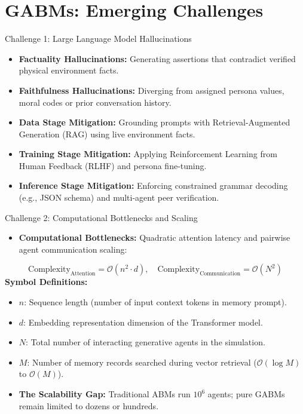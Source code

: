 \documentclass{beamer}
\begin{document}
\section{GABMs: Emerging Challenges}

\begin{frame}{Challenge 1: Large Language Model Hallucinations}
\begin{itemize}
    \item \textbf{Factuality Hallucinations:} Generating assertions that contradict verified physical environment facts.
    \medskip
    \item \textbf{Faithfulness Hallucinations:} Diverging from assigned persona values, moral codes or prior conversation history.
    \medskip
    \item \textbf{Data Stage Mitigation:} Grounding prompts with Retrieval-Augmented Generation (RAG) using live environment facts.
    \medskip
    \item \textbf{Training Stage Mitigation:} Applying Reinforcement Learning from Human Feedback (RLHF) and persona fine-tuning.
    \medskip
    \item \textbf{Inference Stage Mitigation:} Enforcing constrained grammar decoding (e.g., JSON schema) and multi-agent peer verification.
\end{itemize}
\end{frame}

\begin{frame}{Challenge 2: Computational Bottlenecks and Scaling}
\begin{itemize}
    \item \textbf{Computational Bottlenecks:} Quadratic attention latency and pairwise agent communication scaling:
\end{itemize}
\vspace{-0.15cm}
\begin{equation*}
\text{Complexity}_{\text{Attention}} = \mathcal{O}(n^2 \cdot d), \quad \text{Complexity}_{\text{Communication}} = \mathcal{O}(N^2)
\end{equation*}
\vspace{-0.25cm}
\textbf{Symbol Definitions:}
\vspace{0.1cm}
\begin{itemize}
    \item $n$: Sequence length (number of input context tokens in memory prompt).
    \item $d$: Embedding representation dimension of the Transformer model.
    \item $N$: Total number of interacting generative agents in the simulation.
    \item $M$: Number of memory records searched during vector retrieval ($\mathcal{O}(\log M)$ to $\mathcal{O}(M)$).
    \item \textbf{The Scalability Gap:} Traditional ABMs run $10^6$ agents; pure GABMs remain limited to dozens or hundreds.
\end{itemize}
\end{frame}
\end{document}
